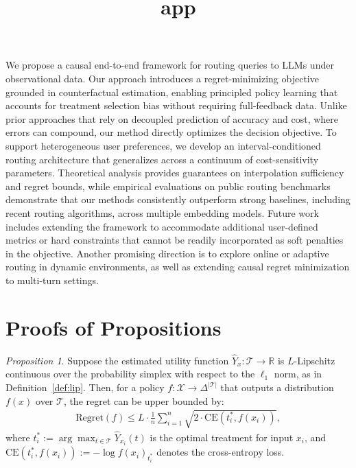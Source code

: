 \documentclass{article}
\theoremstyle{remark}
\newtheorem{proposition}{Proposition}
\begin{document}
We propose a causal end-to-end framework for routing queries to LLMs under observational data. Our approach introduces a regret-minimizing objective grounded in counterfactual estimation, enabling principled policy learning that accounts for treatment selection bias without requiring full-feedback data. Unlike prior approaches that rely on decoupled prediction of accuracy and cost, where errors can compound, our method directly optimizes the decision objective. To support heterogeneous user preferences, we develop an interval-conditioned routing architecture that generalizes across a continuum of cost-sensitivity parameters. Theoretical analysis provides guarantees on interpolation sufficiency and regret bounds, while empirical evaluations on public routing benchmarks demonstrate that our methods consistently outperform strong baselines, including recent routing algorithms, across multiple embedding models. Future work includes extending the framework to accommodate additional user-defined metrics or hard constraints that cannot be readily incorporated as soft penalties in the objective. Another promising direction is to explore online or adaptive routing in dynamic environments, as well as extending causal regret minimization to multi-turn settings.

\nocite{*}









\newpage
\appendix
\title{app}

\setcounter{proposition}{0}
\setcounter{corollary}{0}

\renewcommand{\theproposition}{\arabic{proposition}}
\renewcommand{\thecorollary}{\arabic{corollary}}





\section{Proofs of Propositions}

\begin{proposition}
Suppose the estimated utility function $\hat{Y}_x : \mathcal{T} \to \mathbb{R}$ is $L$-Lipschitz continuous over the probability simplex with respect to the $\ell_1$ norm, as in Definition~\ref{def:lip}. Then, for a policy $f : \mathcal{X} \to \Delta^{|\mathcal{T}|}$ that outputs a distribution $f(x)$ over $\mathcal{T}$, the regret can be upper bounded by:
\begin{align}
    \text{Regret}(f) \leq L \cdot \frac{1}{n} \sum_{i=1}^n \sqrt{2 \cdot \text{CE}(t_i^*, f(x_i))},
\end{align}
where $t_i^* := \arg\max_{t \in \mathcal{T}} \hat{Y}_{x_i}(t)$ is the optimal treatment for input $x_i$, and $\text{CE}(t_i^*, f(x_i)) := -\log f(x_i)_{t_i^*}$ denotes the cross-entropy loss.
\end{proposition}
\end{document}
